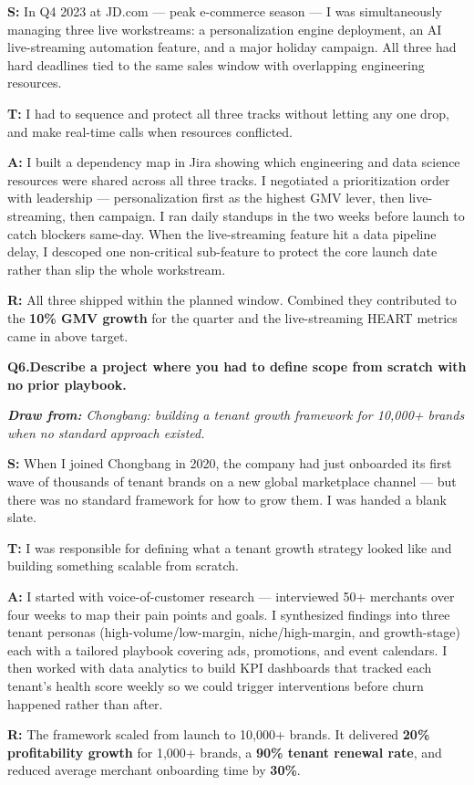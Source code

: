 \documentclass[10pt, letterpaper]{article}
\newcommand{\q}[2]{%
    \smallskip
    \noindent\textbf{\small Q#1.}\quad\textbf{#2}
    \vspace{3pt}
}
\newcommand{\hint}[1]{%
    \begin{notebox}
    \footnotesize\textit{\textbf{Draw from:} #1}
    \end{notebox}
}
\newcommand{\s}[1]{\textbf{\textcolor{starlabel}{S:}} #1}
\newcommand{\ta}[1]{\textbf{\textcolor{starlabel}{T:}} #1}
\newcommand{\ac}[1]{\textbf{\textcolor{starlabel}{A:}} #1}
\newcommand{\res}[1]{\textbf{\textcolor{starlabel}{R:}} #1}
\begin{document}
\begin{answerbox}
\footnotesize
\s{In Q4 2023 at JD.com --- peak e-commerce season --- I was simultaneously managing three live workstreams: a personalization engine deployment, an AI live-streaming automation feature, and a major holiday campaign. All three had hard deadlines tied to the same sales window with overlapping engineering resources.}

\medskip
\ta{I had to sequence and protect all three tracks without letting any one drop, and make real-time calls when resources conflicted.}

\medskip
\ac{I built a dependency map in Jira showing which engineering and data science resources were shared across all three tracks. I negotiated a prioritization order with leadership --- personalization first as the highest GMV lever, then live-streaming, then campaign. I ran daily standups in the two weeks before launch to catch blockers same-day. When the live-streaming feature hit a data pipeline delay, I descoped one non-critical sub-feature to protect the core launch date rather than slip the whole workstream.}

\medskip
\res{All three shipped within the planned window. Combined they contributed to the \textbf{10\% GMV growth} for the quarter and the live-streaming HEART metrics came in above target.}
\end{answerbox}

\q{6}{Describe a project where you had to define scope from scratch with no prior playbook.}
\hint{Chongbang: building a tenant growth framework for 10,000+ brands when no standard approach existed.}

\begin{answerbox}
\footnotesize
\s{When I joined Chongbang in 2020, the company had just onboarded its first wave of thousands of tenant brands on a new global marketplace channel --- but there was no standard framework for how to grow them. I was handed a blank slate.}

\medskip
\ta{I was responsible for defining what a tenant growth strategy looked like and building something scalable from scratch.}

\medskip
\ac{I started with voice-of-customer research --- interviewed 50+ merchants over four weeks to map their pain points and goals. I synthesized findings into three tenant personas (high-volume/low-margin, niche/high-margin, and growth-stage) each with a tailored playbook covering ads, promotions, and event calendars. I then worked with data analytics to build KPI dashboards that tracked each tenant's health score weekly so we could trigger interventions before churn happened rather than after.}

\medskip
\res{The framework scaled from launch to 10,000+ brands. It delivered \textbf{20\% profitability growth} for 1,000+ brands, a \textbf{90\% tenant renewal rate}, and reduced average merchant onboarding time by \textbf{30\%}.}
\end{answerbox}
\end{document}
